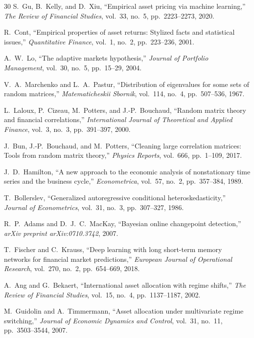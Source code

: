 \documentclass[conference]{IEEEtran}
\begin{document}
\begin{thebibliography}{30}
S.~Gu, B.~Kelly, and D.~Xiu, ``Empirical asset pricing via machine learning,'' \textit{The Review of Financial Studies}, vol.~33, no.~5, pp.~2223--2273, 2020.

R.~Cont, ``Empirical properties of asset returns: Stylized facts and statistical issues,'' \textit{Quantitative Finance}, vol.~1, no.~2, pp.~223--236, 2001.

A.~W.~Lo, ``The adaptive markets hypothesis,'' \textit{Journal of Portfolio Management}, vol.~30, no.~5, pp.~15--29, 2004.

V.~A.~Marchenko and L.~A.~Pastur, ``Distribution of eigenvalues for some sets of random matrices,'' \textit{Matematicheskii Sbornik}, vol.~114, no.~4, pp.~507--536, 1967.

L.~Laloux, P.~Cizeau, M.~Potters, and J.-P.~Bouchaud, ``Random matrix theory and financial correlations,'' \textit{International Journal of Theoretical and Applied Finance}, vol.~3, no.~3, pp.~391--397, 2000.

J.~Bun, J.-P.~Bouchaud, and M.~Potters, ``Cleaning large correlation matrices: Tools from random matrix theory,'' \textit{Physics Reports}, vol.~666, pp.~1--109, 2017.

J.~D.~Hamilton, ``A new approach to the economic analysis of nonstationary time series and the business cycle,'' \textit{Econometrica}, vol.~57, no.~2, pp.~357--384, 1989.

T.~Bollerslev, ``Generalized autoregressive conditional heteroskedasticity,'' \textit{Journal of Econometrics}, vol.~31, no.~3, pp.~307--327, 1986.

R.~P.~Adams and D.~J.~C.~MacKay, ``Bayesian online changepoint detection,'' \textit{arXiv preprint arXiv:0710.3742}, 2007.

T.~Fischer and C.~Krauss, ``Deep learning with long short-term memory networks for financial market predictions,'' \textit{European Journal of Operational Research}, vol.~270, no.~2, pp.~654--669, 2018.

A.~Ang and G.~Bekaert, ``International asset allocation with regime shifts,'' \textit{The Review of Financial Studies}, vol.~15, no.~4, pp.~1137--1187, 2002.

M.~Guidolin and A.~Timmermann, ``Asset allocation under multivariate regime switching,'' \textit{Journal of Economic Dynamics and Control}, vol.~31, no.~11, pp.~3503--3544, 2007.


\end{thebibliography}
\end{document}
